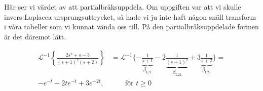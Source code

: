 \documentclass[a4paper]{article}
\begin{document}
Här ser vi värdet av att partialbråksuppdela. Om uppgiften var att vi skulle invers-Laplacea ursprungsuttrycket, så hade vi ju inte haft någon snäll transform i våra tabeller som vi kunnat vända oss till. På den partialbråksuppdelade formen är det däremot lätt.

\begin{align*}
  \mathcal{L}^{-1}\left\{\frac{2s^2 + s -3}{(s+1)^2(s+2)}\right\} &= \mathcal{L}^{-1}\{ -\underbrace{\frac{1}{s+1}}_{\beta_{\text{L21}}} -2\underbrace{\frac{1}{(s+1)^2}}_{\beta_{\text{L22}}} + 3\underbrace{\frac{1}{s+2}}_{\beta_{\text{L21}}} \}= \\
  -e^{-t} -2te^{-t} + 3 e^{-2t}, &\qquad \text{för $t \geq 0$}
\end{align*}
\end{document}
